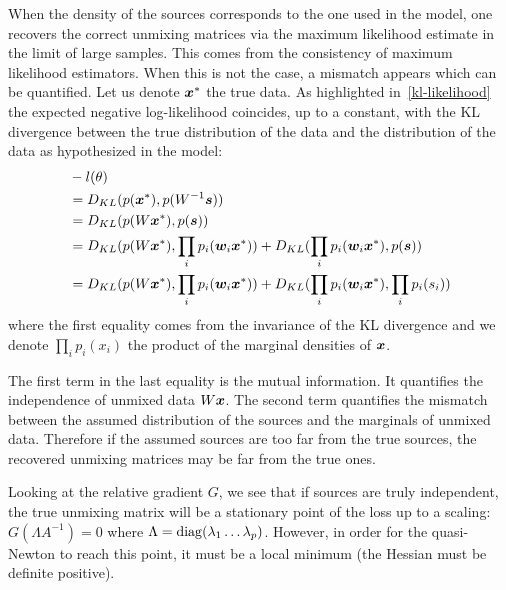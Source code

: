 When the density of the sources corresponds to the one used in the model, one
recovers the correct unmixing matrices via the maximum likelihood estimate in the
limit of large samples. This comes from the consistency of maximum likelihood
estimators.
When this is not the case, a mismatch appears which can be quantified. Let us
denote $\boldsymbol{x}^*$ the true data. As highlighted in~\eqref{kl-likelihood} the expected
negative log-likelihood coincides, up to a constant, with the KL divergence between the true
distribution of the data and the distribution of the data as hypothesized in the
model:
\begin{align}
  &-l(\theta) \\
  &=  D_{KL}(p(\boldsymbol{x}^*), p(W^{-1} \boldsymbol{s})) \\
             &=  D_{KL}(p(W\boldsymbol{x}^*), p(\boldsymbol{s})) \\
             &=  D_{KL}(p(W \boldsymbol{x}^*), \prod_i p_i(\boldsymbol{w}_i\boldsymbol{x}^*)) + D_{KL}(\prod_i p_i(\boldsymbol{w}_i\boldsymbol{x}^*), p(\boldsymbol{s})) \\
             &=  D_{KL}(p(W \boldsymbol{x}^*), \prod_i p_i(\boldsymbol{w}_i\boldsymbol{x}^*)) + D_{KL}(\prod_i p_i(\boldsymbol{w}_i\boldsymbol{x}^*), \prod_i p_i(s_i)) \\
\end{align}
where the first equality comes from the invariance of the KL divergence and we
denote $\prod_i p_i(x_i)$ the product of the marginal densities of $\boldsymbol{x}$.

The first term in the last equality is the mutual information. It quantifies the
independence of unmixed data $W \boldsymbol{x}$. The second term quantifies the mismatch
between the assumed distribution of the sources and the marginals of unmixed data.
Therefore if the assumed sources are too far from the true sources, the
recovered unmixing matrices may be far from the true ones.


Looking at the relative gradient $G$, we see that if sources are truly
independent, the true unmixing matrix will be a stationary point of the loss up
to a scaling: $G(\Lambda A^{-1})=0$ where $\Lambda=\operatorname*{diag}(\lambda_1 \dots \lambda_p)$.
However, in order for the quasi-Newton to reach this point, it must be a local
minimum (the Hessian must be definite positive). 

